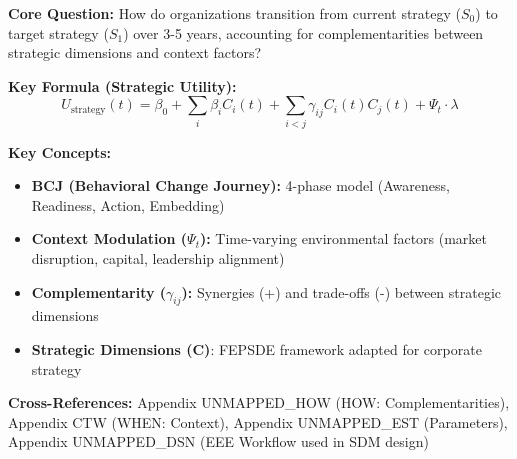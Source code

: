 \begin{tcolorbox}[colback=blue!5!white, colframe=blue!75!black,
    title=Quick Reference: Strategy Design Model v1.0]

\textbf{Core Question:} How do organizations transition from current strategy ($S_0$) to target strategy ($S_1$) over 3-5 years, accounting for complementarities between strategic dimensions and context factors?

\textbf{Key Formula (Strategic Utility):}
\begin{equation}
U_{\text{strategy}}(t) = \beta_0 + \sum_{i} \beta_i C_i(t) + \sum_{i<j} \gamma_{ij} C_i(t) C_j(t) + \Psi_t \cdot \lambda
\end{equation}

\textbf{Key Concepts:}
\begin{itemize}[nosep]
\item \textbf{BCJ (Behavioral Change Journey):} 4-phase model (Awareness, Readiness, Action, Embedding)
\item \textbf{Context Modulation ($\Psi_t$):} Time-varying environmental factors (market disruption, capital, leadership alignment)
\item \textbf{Complementarity ($\gamma_{ij}$):} Synergies (+) and trade-offs (-) between strategic dimensions
\item \textbf{Strategic Dimensions (C)}: FEPSDE framework adapted for corporate strategy
\end{itemize}

\textbf{Cross-References:} Appendix UNMAPPED_HOW (HOW: Complementarities), Appendix CTW (WHEN: Context), Appendix UNMAPPED_EST (Parameters), Appendix UNMAPPED_DSN (EEE Workflow used in SDM design)

\end{tcolorbox}



